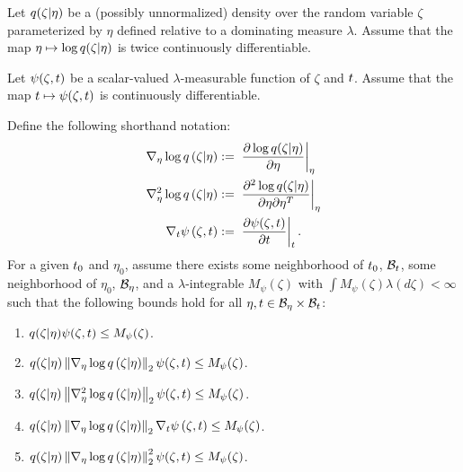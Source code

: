 \begin{assu}
%
Let $q(\zeta \vert \eta)$ be a (possibly unnormalized) density over the random
variable $\zeta$ parameterized by $\eta$ defined relative to a dominating
measure $\lambda$.  Assume that the map $\eta \mapsto \log q(\zeta \vert \eta)$
is twice continuously differentiable.

Let $\psi(\zeta, t)$ be a scalar-valued $\lambda$-measurable function of
$\zeta$ and $t$.  Assume that the map $t \mapsto \psi(\zeta, t)$ is
continuously differentiable.

Define the following shorthand notation:
%
\begin{align*}
%
\lqgrad{\zeta \vert \eta} :={}&
    \fracat{\partial \log \q(\zeta \vert \eta)}{\partial \eta}{\eta} \\
%
\lqhess{\zeta \vert \eta} :={}&
    \fracat{\partial^2 \log \q(\zeta \vert \eta)}
           {\partial \eta \partial \eta^T}{\eta} \\
%
\psigrad{\zeta, \t} :={}& \fracat{\partial \psi(\zeta, \t)}{\partial \t}{\t}.
%
\end{align*}
%
For a given $t_0$ and $\eta_0$, assume there exists some neighborhood of
$t_0$, $\mathcal{B}_t$, some neighborhood of $\eta_0$, $\mathcal{B}_\eta$, and a
$\lambda$-integrable $M_\psi(\zeta)$ with $\int M_\psi(\zeta) \lambda(d\zeta) <
\infty$ such that the following bounds hold for all $\eta, t \in \mathcal{B}_\eta
\times \mathcal{B}_t$:
%
\begin{enumerate}
%
\item {}
$q(\zeta \vert \eta) \psi(\zeta, t) \le M_\psi(\zeta)$.
%
\item {}
$q(\zeta \vert \eta) \left\Vert{\nabla_\eta \log q}\left(\zeta \vert \eta\right)\right\Vert_2 \psi(\zeta, t) \le
M_\psi(\zeta)$.
%
\item {}
$q(\zeta \vert \eta) \left\Vert{\nabla_\eta^2 \log q}\left(\zeta \vert \eta\right)\right\Vert_2 \psi(\zeta, t) \le
M_\psi(\zeta)$.
%
\item {}
$q(\zeta \vert \eta) \left\Vert{\nabla_\eta \log q}\left(\zeta \vert \eta\right)\right\Vert_2 {\nabla_t \psi}\left(\zeta, t\right)
\le M_\psi(\zeta)$.
%
\item {}
$q(\zeta \vert \eta) \left\Vert{\nabla_\eta \log q}\left(\zeta \vert \eta\right)\right\Vert^2_2 \psi(\zeta, t) \le
M_\psi(\zeta)$.
%
\end{enumerate}
%
\end{assu}

